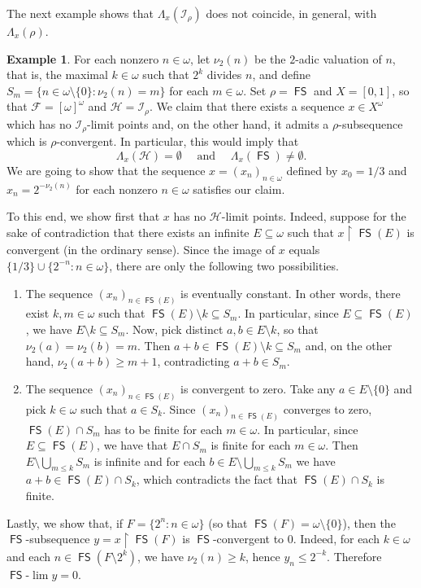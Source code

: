\documentclass{amsart}
\theoremstyle{plain}
\theoremstyle{definition}
\newtheorem{example}[thm]{Example}
\theoremstyle{remark}
\newcommand{\cI}{\mathcal{I}}
\newcommand{\I}{\cI}
\DeclareMathOperator{\FS}{\mathsf{FS}}
\begin{document}
The next example shows that $\Lambda_x(\I_\rho)$ does not coincide, in general, with $\Lambda_x(\rho)$. 
\begin{example}
For each nonzero $n \in \omega$, let $\nu_2(n)$ be the $2$-adic valuation of $n$, that is, the maximal $k \in \omega$ such that $2^k$ divides $n$, and define $S_m=\{n \in \omega\setminus \{0\}: \nu_2(n)=m\}$ for each $m \in \omega$. Set $\rho=\FS$ and $X=[0,1]$, so that $\mathcal{F}=[\omega]^\omega$ and $\mathcal{H}=\I_\rho$. We claim that there exists a sequence $x\in X^\omega$ which has no $\mathcal{I}_\rho$-limit points and, on the other hand, it admits a $\rho$-subsequence which is $\rho$-convergent. In particular, this would imply that
\begin{equation*}
\Lambda_x({\mathcal{H}})=\emptyset
\quad \text{ and }\quad 
\Lambda_x({\FS})\neq \emptyset.
\end{equation*}
We are going to show that the sequence $x=(x_n)_{n \in \omega}$ defined by $x_0=1/3$ and $x_n=2^{-\nu_2(n)}$ for each nonzero $n \in \omega$ satisfies our claim. 

To this end, we show first that $x$ has no $\mathcal{H}$-limit points. Indeed, suppose for the sake of contradiction that there exists an infinite $E\subseteq \omega$ such that $x\upharpoonright \FS(E)$ is convergent (in the ordinary sense). Since the image of $x$ equals $\{1/3\}\cup \{2^{-n}:n\in\omega\}$, there are only the following two possibilities.
\begin{enumerate}[label={\rm (\roman{*})}]
    \item The sequence $(x_n)_{n \in \FS(E)}$ is eventually constant. In other words, there exist $k,m \in \omega$ such that $\FS(E)\setminus k\subseteq S_m$. In particular, since $E\subseteq \FS(E)$, we have $E\setminus k \subseteq S_m$. Now, pick distinct $a,b \in E\setminus k$, so that $\nu_2(a)=\nu_2(b)=m$. Then $a+b \in  \FS(E)\setminus k\subseteq S_m$ and, on the other hand, $\nu_2(a+b)\ge m+1$, 
    contradicting $a+b \in S_m$. 
    
    \item The sequence $(x_n)_{n \in \FS(E)}$ is convergent to zero. Take any $a\in E\setminus\{0\}$ and pick $k\in \omega$ such that $a\in S_k$. Since $(x_n)_{n \in \FS(E)}$ converges to zero, $\FS(E)\cap S_m$ has to be finite for each $m\in\omega$. In particular, since $E\subseteq\FS(E)$, we have that $E\cap S_m$ is finite for each $m\in\omega$. Then $E\setminus\bigcup_{m\leq k}S_m$ is infinite and for each $b\in E\setminus\bigcup_{m\leq k}S_m$ we have $a+b\in\FS(E)\cap S_k$, which contradicts the fact that $\FS(E)\cap S_k$ is finite. 
\end{enumerate}

Lastly, we show that, if $F=\{2^n: n \in \omega\}$ (so that $\FS(F)=\omega\setminus \{0\}$), then the $\FS$-subsequence $y=x\upharpoonright \FS(F)$ is $\FS$-convergent to $0$. Indeed, for each $k \in \omega$ and each $n \in \FS(F\setminus 2^k)$, we have $\nu_2(n)\ge k$, hence $y_n \le 2^{-k}$. Therefore $\FS\text{-}\lim y=0$. 
\end{example}
\end{document}
